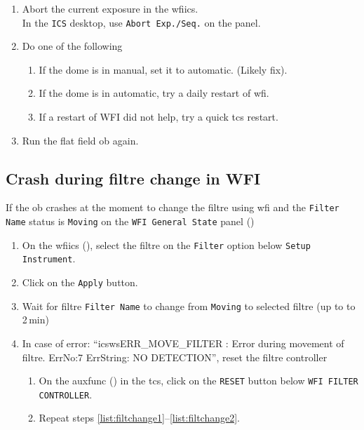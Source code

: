 \documentclass[11pt,fleqn,a4paper]{book}
\begin{document}
\begin{enumerate}
\item Abort the current exposure in the \gls{wfiics}.\\
      In the \texttt{ICS} \gls{desktop}, use \texttt{Abort Exp./Seq.} on the panel. 
\item Do one of the following
   \begin{enumerate}
        \item If the dome is in manual, set it to automatic. (Likely fix).
        \item If the dome is in automatic, try a daily restart of \gls{wfi}.
        \item If a restart of WFI did not help, try a quick \gls{tcs} restart.
   \end{enumerate} 
\item Run the flat field \gls{ob} again.
\end{enumerate}

\subsection{Crash during filtre change in WFI}
\label{sec:crashfiltre}

\label{proc:filtrereset}
If the \gls{ob} crashes at the moment to change the filtre using \gls{wfi} and the \texttt{Filter Name} status is \texttt{Moving} on the \texttt{WFI \gls{General State}} panel ()
 \begin{enumerate}
      \item On the \gls{wfiics} (), select the filtre on the \texttt{Filter} option below \texttt{Setup Instrument}.\label{list:filtchange1}
      \item Click on the \texttt{Apply} button.
      \item Wait for filtre \texttt{Filter Name} to change from \texttt{Moving} to selected filtre (up to to 2\,min)\label{list:filtchange2}
      \item In case of error: ``icswsERR\_MOVE\_FILTER : Error during movement of filtre. ErrNo:7 ErrString: NO DETECTION'', reset the filtre controller
           \begin{enumerate}
           \item On the \gls{auxfunc} () in the \gls{tcs}, click on the \texttt{RESET} button below \texttt {WFI FILTER CONTROLLER}.
           \item Repeat steps \ref{list:filtchange1}--\ref{list:filtchange2}.
           \end{enumerate}
 \end{enumerate}
\end{document}

